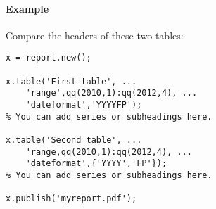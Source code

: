 \paragraph{Example}\label{example}

Compare the headers of these two tables:

\begin{verbatim}
x = report.new();

x.table('First table', ...
    'range',qq(2010,1):qq(2012,4), ...
    'dateformat','YYYYFP');
% You can add series or subheadings here.

x.table('Second table', ...
    'range,qq(2010,1):qq(2012,4), ...
    'dateformat',{'YYYY','FP'});
% You can add series or subheadings here.

x.publish('myreport.pdf');
\end{verbatim}


